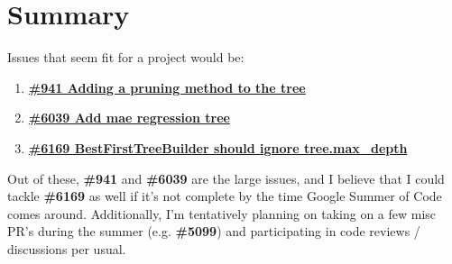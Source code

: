 \documentclass[12pt, oneside]{article}
\begin{document}
\section{Summary}
Issues that seem fit for a project would be:
\begin{enumerate}
  \item
  \textbf{\href{https://github.com/scikit-learn/scikit-learn/pull/941}
    {\#941 Adding a pruning method to the tree}}
  \item
  \textbf{\href{https://github.com/scikit-learn/scikit-learn/pull/6039}
    {\#6039 Add mae regression tree}}
  \item
  \textbf{\href{https://github.com/scikit-learn/scikit-learn/pull/6169}
    {\#6169 BestFirstTreeBuilder should ignore tree.max\_depth}}
\end{enumerate}
Out of these, \textbf{\#941} and \textbf{\#6039} are the large issues,
and I believe that I could tackle \textbf{\#6169} as well if it's not
complete by the time Google Summer of Code comes around. Additionally, I'm tentatively
planning on taking on a few misc PR's during the summer
(e.g. \textbf{\#5099}) and participating in code reviews / discussions
per usual.
\end{document}
